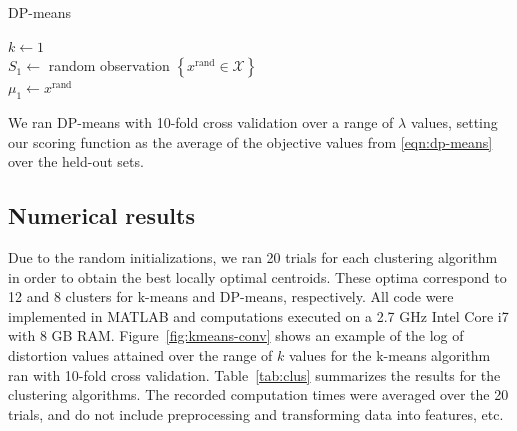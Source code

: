 \documentclass[letterpaper,10 pt,conference]{ieeeconf}
\begin{document}
\begin{algorithm}[!htbp]
  \caption{DP-means}

  \DontPrintSemicolon

  
  
  \smallskip

  $k \leftarrow 1$ \\
  $S_{1} \leftarrow$ random observation $\left\{x^{\text{rand}}\in\mathcal{X}\right\}$ \\
  $\mu_{1} \leftarrow x^{\text{rand}}$


  \label{alg:dp-means}
\end{algorithm}

We ran DP-means with 10-fold cross validation over a range of $\lambda$ values, setting our scoring function as the average of the objective values from \eqref{eqn:dp-means} over the held-out sets.

\subsection{Numerical results}

Due to the random initializations, we ran 20 trials for each clustering algorithm in order to obtain the best locally optimal centroids. These optima correspond to 12 and 8 clusters for k-means and DP-means, respectively. All code were implemented in MATLAB and computations executed on a 2.7 GHz Intel Core i7 with 8 GB RAM. Figure~\ref{fig:kmeans-conv} shows an example of the log of distortion values attained over the range of $k$ values for the k-means algorithm ran with 10-fold cross validation. Table~\ref{tab:clus} summarizes the results for the clustering algorithms. The recorded computation times were averaged over the 20 trials, and do not include preprocessing and transforming data into features, etc.
\end{document}
